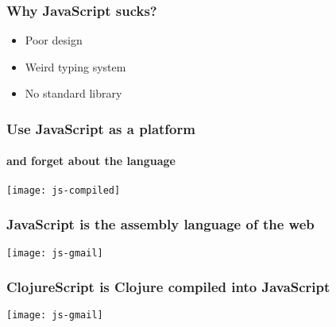 \begin{frame}
  \frametitle{Why JavaScript sucks?}
  \begin{itemize}
  \item Poor design
  \item Weird typing system
  \item No standard library
  \end{itemize}
\end{frame}

\begin{frame}
  \frametitle{Use JavaScript as a platform}
  \framesubtitle{and forget about the language}

  \begin{center}
      {\texttt{[image: js-compiled]}}
  \end{center}
\end{frame}


\begin{frame}
  \frametitle{JavaScript is the assembly language of the web}

  \begin{center}
      {\texttt{[image: js-gmail]}}
  \end{center}

\end{frame}



\begin{frame}
  \frametitle{ClojureScript is Clojure compiled into JavaScript}

  \begin{center}
      {\texttt{[image: js-gmail]}}
  \end{center}

\end{frame}


